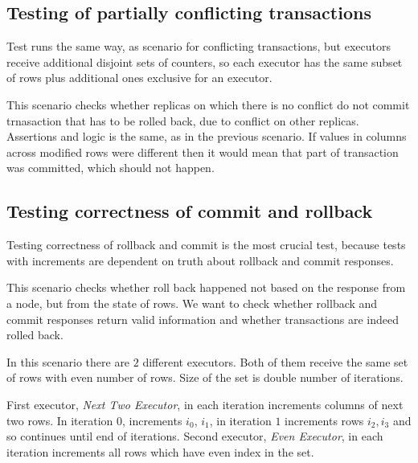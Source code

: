\subsection{Testing of partially conflicting transactions}
Test runs the same way, as scenario for conflicting transactions, but executors receive additional disjoint sets of counters, so each executor has the same subset of rows plus additional ones exclusive for an executor. 

This scenario checks whether replicas on which there is no conflict do not commit trnasaction that has to be rolled back, due to conflict on other replicas. Assertions and logic is the same, as in the previous scenario. If values in columns across modified rows were different then it would mean that part of transaction was committed, which should not happen.


\subsection{Testing correctness of commit and rollback}
Testing correctness of rollback and commit is the most crucial test, because tests with increments are dependent on truth about rollback and commit responses. 

This scenario checks whether roll back happened not based on the response from a node, but from the state of rows. We want to check whether rollback and commit responses return valid information and whether transactions are indeed rolled back.

In this scenario there are $2$ different executors. Both of them receive the same set of rows with even number of rows. Size of the set is double number of iterations. 

First executor, \emph{Next Two Executor}, in each iteration increments columns of next two rows. In iteration $0$, increments $i_{0}$, $i_{1}$, in iteration $1$ increments rows $i_{2}, i_{3}$ and so continues until end of iterations. Second executor, \emph{Even Executor}, in each iteration increments all rows which have even index in the set.

